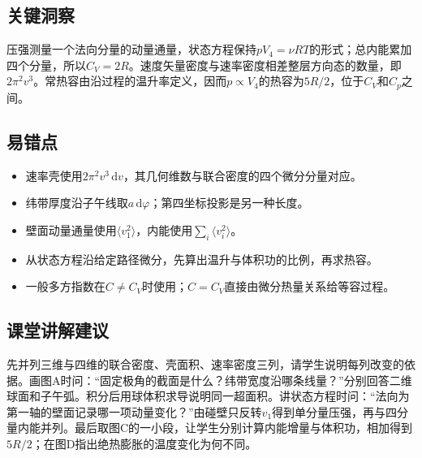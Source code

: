 \documentclass[UTF8,fontset=fandol,a4paper,11pt]{ctexart}
\begin{document}


\subsection*{关键洞察}

压强测量一个法向分量的动量通量，状态方程保持$pV_4=\nu RT$的形式；总内能累加四个分量，所以$C_V=2R$。速度矢量密度与速率密度相差整层方向态的数量，即$2\pi^2v^3$。常热容由沿过程的温升率定义，因而$p\propto V_4$的热容为$5R/2$，位于$C_V$和$C_p$之间。



\subsection*{易错点}

\begin{itemize}
\item 速率壳使用$2\pi^2v^3\,\mathrm dv$，其几何维数与联合密度的四个微分分量对应。
\item 纬带厚度沿子午线取$a\,\mathrm d\varphi$；第四坐标投影是另一种长度。
\item 壁面动量通量使用$\langle v_1^2\rangle$，内能使用$\sum_i\langle v_i^2\rangle$。
\item 从状态方程沿给定路径微分，先算出温升与体积功的比例，再求热容。
\item 一般多方指数在$C\ne C_V$时使用；$C=C_V$直接由微分热量关系给等容过程。
\end{itemize}



\subsection*{课堂讲解建议}

先并列三维与四维的联合密度、壳面积、速率密度三列，请学生说明每列改变的依据。画图A时问：“固定极角的截面是什么？纬带宽度沿哪条线量？”分别回答二维球面和子午弧。积分后用球体积求导说明同一超面积。讲状态方程时问：“法向为第一轴的壁面记录哪一项动量变化？”由碰壁只反转$v_1$得到单分量压强，再与四分量内能并列。最后取图C的一小段，让学生分别计算内能增量与体积功，相加得到$5R/2$；在图D指出绝热膨胀的温度变化为何不同。

\end{document}
